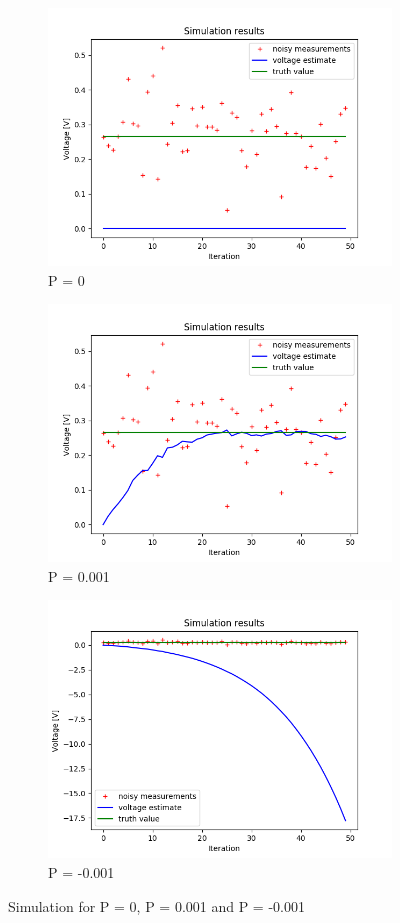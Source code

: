 \documentclass{article}
\begin{document}
    \begin{figure}[H]
        \begin{subfigure} {.3\textwidth}  
            \centering 
            \includegraphics[width=0.6\linewidth]{./img/P0_.png}
            \caption{P = 0 }
        \end{subfigure}
        \begin{subfigure}{.3\textwidth}            
            \centering
            \includegraphics[width=0.6\linewidth]{./img/P001_.png}
            \caption{P = 0.001}
        \end{subfigure}    
        \begin{subfigure} {.3\textwidth}         
            \centering
            \includegraphics[width=0.6\linewidth]{./img/Pneg.png}
            \caption{P = -0.001}
        \end{subfigure}
        \caption{Simulation for P = 0, P =  0.001 and P = -0.001}
        \label{fig:simulation7}
    \end{figure}
\end{document}
